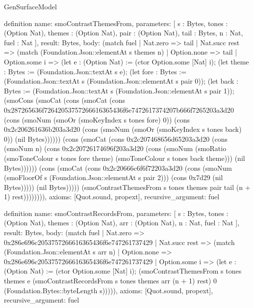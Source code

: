 \begin{lexlean}{GenSurfaceModel}
\begin{semanticmodule}
definition{
  name: smoContrastThemesFrom,
  parameters: [
    s : Bytes,
    tones : (Option Nat),
    themes : (Option Nat),
    pair : (Option Nat),
    tail : Bytes,
    n : Nat,
    fuel : Nat
  ],
  result: Bytes,
  body: (match fuel
    | Nat.zero => tail
    | Nat.succ rest => (match (Foundation.Json::elementAt s themes n)
      | Option.none => tail
      | Option.some i => (let e : (Option Nat) := (ctor Option.some [Nat] i); (let theme : Bytes := (Foundation.Json::textAt s e); (let fore : Bytes := (Foundation.Json::textAt s (Foundation.Json::elementAt s pair 0)); (let back : Bytes := (Foundation.Json::textAt s (Foundation.Json::elementAt s pair 1)); (smoCons (smoCat (cons (smoCat (cons 0x287265636f72642053757266616365436f6e7472617374207b666f7265203a3d20 (cons (smoNum (smoOr (smoKeyIndex s tones fore) 0)) (cons 0x2c206261636b203a3d20 (cons (smoNum (smoOr (smoKeyIndex s tones back) 0)) (nil Bytes)))))) (cons (smoCat (cons 0x2c207468656d65203a3d20 (cons (smoNum n) (cons 0x2c20726174696f203a3d20 (cons (smoNum (smoRatio (smoToneColour s tones fore theme) (smoToneColour s tones back theme))) (nil Bytes)))))) (cons (smoCat (cons 0x2c20666c6f6f72203a3d20 (cons (smoNum (smoFloorOf s (Foundation.Json::elementAt s pair 2))) (cons 0x7d29 (nil Bytes))))) (nil Bytes))))) (smoContrastThemesFrom s tones themes pair tail (n + 1) rest)))))))),
  axioms: [Quot.sound, propext],
  recursive_argument: fuel
}

definition{
  name: smoContrastRecordsFrom,
  parameters: [
    s : Bytes,
    tones : (Option Nat),
    themes : (Option Nat),
    arr : (Option Nat),
    n : Nat,
    fuel : Nat
  ],
  result: Bytes,
  body: (match fuel
    | Nat.zero => 0x286e696c2053757266616365436f6e747261737429
    | Nat.succ rest => (match (Foundation.Json::elementAt s arr n)
      | Option.none => 0x286e696c2053757266616365436f6e747261737429
      | Option.some i => (let e : (Option Nat) := (ctor Option.some [Nat] i); (smoContrastThemesFrom s tones themes e (smoContrastRecordsFrom s tones themes arr (n + 1) rest) 0 (Foundation.Bytes::byteLength s))))),
  axioms: [Quot.sound, propext],
  recursive_argument: fuel
}


\end{semanticmodule}
\end{lexlean}

